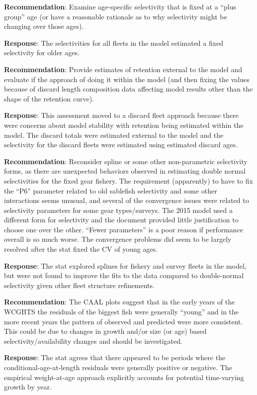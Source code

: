 \documentclass[
  english,
]{article}
\begin{document}
\textbf{Recommendation}: Examine age-specific selectivity that is fixed
at a ``plus group'' age (or have a reasonable rationale as to why
selectivity might be changing over those ages).

\textbf{Response}: The selectivities for all fleets in the model
estimated a fixed selectivity for older ages.

\textbf{Recommendation}: Provide estimates of retention external to the
model and evaluate if the approach of doing it within the model (and
then fixing the values because of discard length composition data
affecting model results other than the shape of the retention curve).

\textbf{Response}: This assessment moved to a discard fleet approach
because there were concerns about model stability with retention being
estimated within the model. The discard totals were estimated external
to the model and the selectivity for the discard fleets were estimated
using estimated discard ages.

\textbf{Recommendation}: Reconsider spline or some other non-parametric
selectivity forms, as there are unexpected behaviors observed in
estimating double normal selectivities for the fixed gear fishery. The
requirement (apparently) to have to fix the ``P6'' parameter related to
old sablefish selectivity and some other interactions seems unusual, and
several of the convergence issues were related to selectivity parameters
for some gear types/surveys. The 2015 model used a different form for
selectivity and the document provided little justification to choose one
over the other. ``Fewer parameters'' is a poor reason if performance
overall is so much worse. The convergence problems did seem to be
largely resolved after the \gls{stat} fixed the CV of young ages.

\textbf{Response}: The \gls{stat} explored splines for fishery and
survey fleets in the model, but were not found to improve the fits to
the data compared to double-normal selectivity given other fleet
structure refinements.

\textbf{Recommendation}: The CAAL plots suggest that in the early years
of the WCGBTS the residuals of the biggest fish were generally ``young''
and in the more recent years the pattern of observed and predicted were
more consistent. This could be due to changes in growth and/or size (or
age) based selectivity/availability changes and should be investigated.

\textbf{Response}: The \gls{stat} agrees that there appeared to be
periods where the conditional-age-at-length residuals were generally
positive or negative. The empirical weight-at-age approach explicitly
accounts for potential time-varying growth by year.
\end{document}
